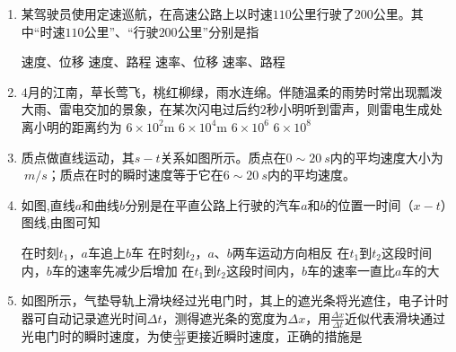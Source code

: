 

\begin{enumerate}[leftmargin=0em]
\renewcommand{\labelenumi}{\arabic{enumi}.}
\item
{}
某驾驶员使用定速巡航，在高速公路上以时速$ 110 $公里行驶了$ 200 $公里。其中“时速$ 110 $公里”、“行驶$ 200 $公里”分别是指  


\fourchoices
{速度、位移 }
{速度、路程}
{速率、位移}
{速率、路程}

\item
{}
$ 4 $月的江南，草长莺飞，桃红柳绿，雨水连绵。伴随温柔的雨势时常出现瓢泼大雨、雷电交加的景象，在某次闪电过后约$ 2 $秒小明听到雷声，则雷电生成处离小明的距离约为
\fourchoices
{$ 6 \times 10 ^ { 2 } \mathrm { m } $}
{$ 6 \times 10 ^ { 4 } \mathrm { m } $}
{$ 6 \times 10 ^ { 6 } $}
{$ 6 \times 10 ^ { 8 } $}





\item 
{}
质点做直线运动，其$ s-t $关系如图所示。质点在$ 0 \sim 20 \ s $内的平均速度大小为$ \ m/s $；质点在时的瞬时速度等于它在$ 6\sim 20 \ s $内的平均速度。
\begin{figure}[h!]
\centering

\end{figure}


\item 
{}
如图,直线$ a $和曲线$ b $分别是在平直公路上行驶的汽车$ a $和$ b $的位置一时间（$ x-t $）图线,由图可知  
\begin{figure}[h!]
\centering

\end{figure}


\fourchoices
{在时刻$ t_{1} $，$ a $车追上$ b $车}
{在时刻$ t_{2} $，$ a $、$ b $两车运动方向相反}
{在$ t_{1} $到$ t_{2} $这段时间内，$ b $车的速率先减少后增加}
{在$ t_{1} $到$ t_{2} $这段时间内，$ b $车的速率一直比$ a $车的大}



\item 
{}
如图所示，气垫导轨上滑块经过光电门时，其上的遮光条将光遮住，电子计时器可自动记录遮光时间$ \Delta t $，测得遮光条的宽度为$ \Delta x $，用$\frac { \Delta x } { \Delta t }$近似代表滑块通过光电门时的瞬时速度，为使$\frac { \Delta x } { \Delta t }$更接近瞬时速度，正确的措施是  
\begin{figure}[h!]
\centering

\end{figure}



\end{enumerate}
